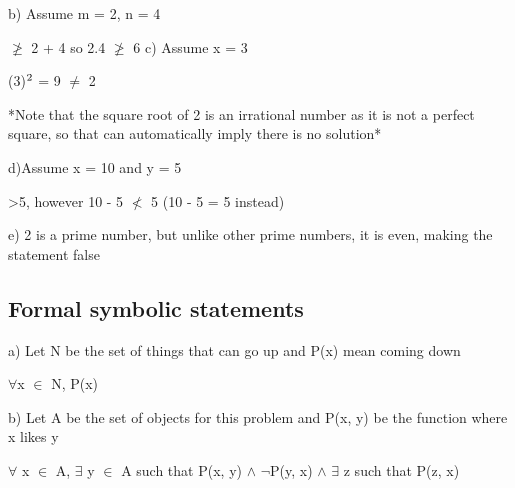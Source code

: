 \documentclass{article}
\begin{document}
    \noindent
    b) Assume m = 2, n = 4\par
     $\ngeq$ 2 + 4 so 2.4 $\ngeq$ 6
    \noindent
    c) Assume x = 3\par
    \noindent
    (3)$\textsuperscript{2}$ = 9 $\neq$ 2\par\noindent
    *Note that the square root of 2 is an irrational number as it is not a perfect square, so that can automatically imply there is no solution*\par\noindent
    d)Assume x = 10 and y = 5\par{} \textgreater  5, however 10 - 5 $\nless$ 5 (10 - 5 = 5 instead) \par\noindent
    e) 2 is a prime number, but unlike other prime numbers, it is even, making the statement false
    
\subsection{Formal symbolic statements}
    a) Let N be the set of things that can go up and P(x) mean coming down\par\noindent
    $\forall$x $\in$ N, P(x)\par\noindent
    b) Let A be the set of objects for this problem and P(x, y) be the function where x likes y\par\noindent
    $\forall$ x $\in$ A, $\exists$ y $\in$ A such that P(x, y) $\wedge$ $\neg$P(y, x) $\wedge$ $\exists$ z such that P(z, x)\par\noindent
\end{document}
